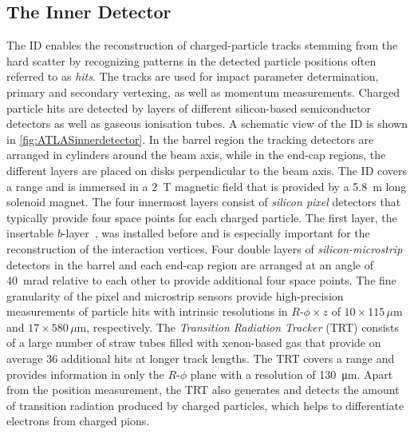 \subsection{The Inner Detector}
\label{subsec:inner-detector}
The ID enables the reconstruction of charged-particle tracks stemming from the hard scatter by recognizing patterns in the detected particle positions often referred to as \emph{hits}. The tracks are used for impact parameter determination, primary and secondary vertexing, as well as momentum measurements.
Charged particle hits are detected by layers of different silicon-based semiconductor detectors as well as gaseous ionisation tubes.
A schematic view of the ID is shown in \cref{fig:ATLASinnerdetector}.
In the barrel region the tracking detectors are arranged in cylinders around the beam axis, while in the end-cap regions, the different layers are placed on disks perpendicular to the beam axis.
The ID covers a range  and is immersed in a \SI{2}{\tesla} magnetic field that is provided by a \SI{5.8}{\m} long solenoid magnet.
The four innermost layers consist of \emph{silicon pixel} detectors that typically provide four space points for each charged particle. The first layer, the insertable $b$-layer~\cite{ATLAS-TDR-19,PIX-2018-001}, was installed before \RunTwo and is especially important for the reconstruction of the interaction vertices.
Four double layers of \emph{silicon-microstrip} detectors in the barrel and each end-cap region are arranged at an angle of \SI{40}{\milli\radian} relative to each other to provide additional four space points. 
The fine granularity of the pixel and microstrip sensors provide high-precision measurements of particle hits with intrinsic resolutions in $R$-$\phi \times z$ of $10 \times 115\,\mu\text{m}$ and $17 \times 580\,\mu\text{m}$, respectively.
The \emph{Transition Radiation Tracker} (TRT) consists of a large number of straw tubes filled with xenon-based gas that provide on average 36 additional hits at longer track lengths. The TRT covers a range  and provides information in only the $R$-$\phi$ plane with a resolution of \SI{130}{\micro\meter}.
Apart from the position measurement, the TRT also generates and detects the amount of transition radiation produced by charged particles, which helps to differentiate electrons from charged pions.

